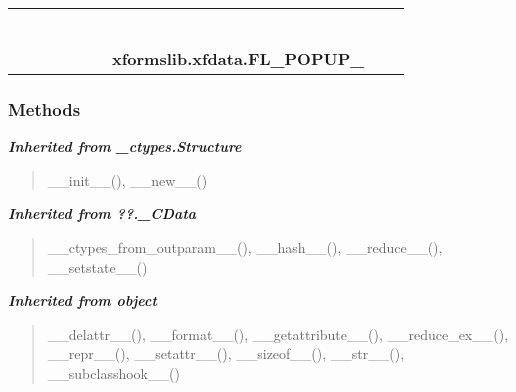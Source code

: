     \label{xformslib:xfdata:FL_POPUP_}
\begin{tabular}{cccccccccc}
\multicolumn{2}{r}{\settowidth{\BCL}{object}\multirow{2}{\BCL}{object}}
&&
&&
&&
  \\\cline{3-3}
  &&\multicolumn{1}{c|}{}
&&
&&
&&
  \\
\multicolumn{4}{r}{\settowidth{\BCL}{??.\_CData}\multirow{2}{\BCL}{??.\_CData}}
&&
&&
  \\\cline{5-5}
  &&&&\multicolumn{1}{c|}{}
&&
&&
  \\
\multicolumn{6}{r}{\settowidth{\BCL}{\_ctypes.Structure}\multirow{2}{\BCL}{\_ctypes.Structure}}
&&
  \\\cline{7-7}
  &&&&&&\multicolumn{1}{c|}{}
&&
  \\
&&&&&&\multicolumn{2}{l}{\textbf{xformslib.xfdata.FL\_POPUP\_}}
\end{tabular}



  \subsubsection{Methods}


\large{\textbf{\textit{Inherited from \_ctypes.Structure}}}

\begin{quote}
\_\_init\_\_(), \_\_new\_\_()
\end{quote}

\large{\textbf{\textit{Inherited from ??.\_CData}}}

\begin{quote}
\_\_ctypes\_from\_outparam\_\_(), \_\_hash\_\_(), \_\_reduce\_\_(), \_\_setstate\_\_()
\end{quote}

\large{\textbf{\textit{Inherited from object}}}

\begin{quote}
\_\_delattr\_\_(), \_\_format\_\_(), \_\_getattribute\_\_(), \_\_reduce\_ex\_\_(), \_\_repr\_\_(), \_\_setattr\_\_(), \_\_sizeof\_\_(), \_\_str\_\_(), \_\_subclasshook\_\_()
\end{quote}


